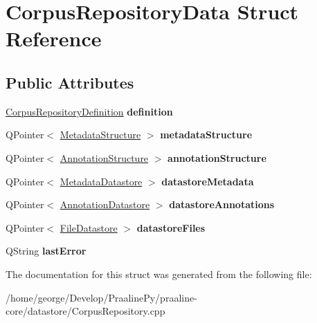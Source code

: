 \hypertarget{struct_corpus_repository_data}{}\section{Corpus\+Repository\+Data Struct Reference}
\label{struct_corpus_repository_data}
\subsection*{Public Attributes}
\begin{DoxyCompactItemize}
\item 
\mbox{\label{struct_corpus_repository_data_ad2777c83efcf381505d50cc30b1a3fd8}} 
\hyperlink{class_corpus_repository_definition}{Corpus\+Repository\+Definition} {\bfseries definition}
\item 
\mbox{\label{struct_corpus_repository_data_af4509614c3d4290d5899db0487d00dee}} 
Q\+Pointer$<$ \hyperlink{class_metadata_structure}{Metadata\+Structure} $>$ {\bfseries metadata\+Structure}
\item 
\mbox{\label{struct_corpus_repository_data_a38f5d8938ab0cc6ce77823470b2d6dc0}} 
Q\+Pointer$<$ \hyperlink{class_annotation_structure}{Annotation\+Structure} $>$ {\bfseries annotation\+Structure}
\item 
\mbox{\label{struct_corpus_repository_data_a57e6849293f27d889108be91db99feeb}} 
Q\+Pointer$<$ \hyperlink{class_metadata_datastore}{Metadata\+Datastore} $>$ {\bfseries datastore\+Metadata}
\item 
\mbox{\label{struct_corpus_repository_data_a609425de01cdd3dde351fb0963a48632}} 
Q\+Pointer$<$ \hyperlink{class_annotation_datastore}{Annotation\+Datastore} $>$ {\bfseries datastore\+Annotations}
\item 
\mbox{\label{struct_corpus_repository_data_abe4e1832acb4e0f8bf3d5ca8777bb478}} 
Q\+Pointer$<$ \hyperlink{class_file_datastore}{File\+Datastore} $>$ {\bfseries datastore\+Files}
\item 
\mbox{\label{struct_corpus_repository_data_a709b1a87f0891f5a8391d387e54291ae}} 
Q\+String {\bfseries last\+Error}
\end{DoxyCompactItemize}


The documentation for this struct was generated from the following file\+:\begin{DoxyCompactItemize}
\item 
/home/george/\+Develop/\+Praaline\+Py/praaline-\/core/datastore/Corpus\+Repository.\+cpp\end{DoxyCompactItemize}
